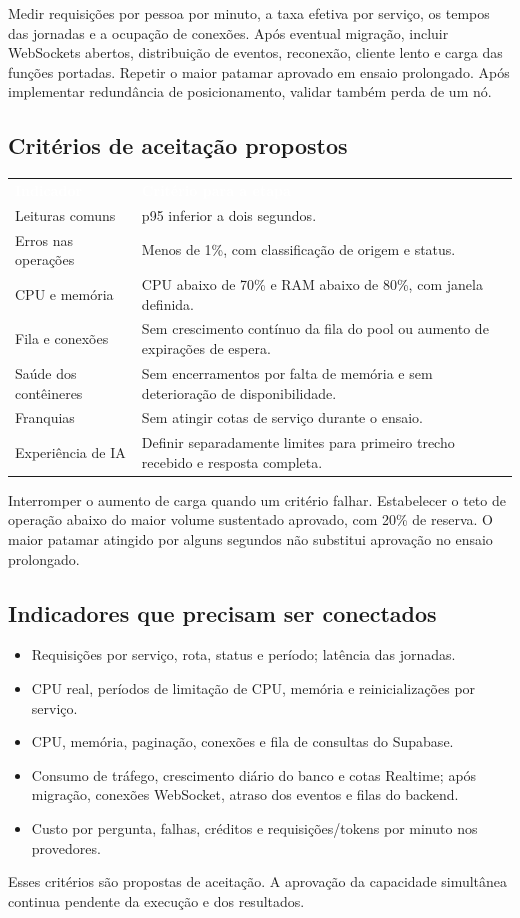 \documentclass[10pt,a4paper]{article}
\newcommand{\smallnote}[1]{\par{\footnotesize\color{NFMuted}#1\par}}
\newcommand{\headcell}[1]{\textcolor{white}{\bfseries #1}}
\begin{document}
Medir requisições por pessoa por minuto, a taxa efetiva por serviço, os tempos das jornadas e a ocupação de conexões. Após eventual migração, incluir WebSockets abertos, distribuição de eventos, reconexão, cliente lento e carga das funções portadas. Repetir o maior patamar aprovado em ensaio prolongado. Após implementar redundância de posicionamento, validar também perda de um nó.

\subsection{Critérios de aceitação propostos}
\begingroup\small\renewcommand{\arraystretch}{1.3}
\par\noindent\begin{tabularx}{\linewidth}{@{}L{42mm}Y@{}}
\headcell{Indicador}&\headcell{Critério para a etapa}\\
Leituras comuns&p95 inferior a dois segundos.\\
Erros nas operações&Menos de 1\%, com classificação de origem e status.\\
CPU e memória&CPU abaixo de 70\% e RAM abaixo de 80\%, com janela definida.\\
Fila e conexões&Sem crescimento contínuo da fila do pool ou aumento de expirações de espera.\\
Saúde dos contêineres&Sem encerramentos por falta de memória e sem deterioração de disponibilidade.\\
Franquias&Sem atingir cotas de serviço durante o ensaio.\\
Experiência de IA&Definir separadamente limites para primeiro trecho recebido e resposta completa.\\
\end{tabularx}\endgroup

Interromper o aumento de carga quando um critério falhar. Estabelecer o teto de operação abaixo do maior volume sustentado aprovado, com 20\% de reserva. O maior patamar atingido por alguns segundos não substitui aprovação no ensaio prolongado.

\subsection{Indicadores que precisam ser conectados}
\begin{itemize}
\item Requisições por serviço, rota, status e período; latência das jornadas.
\item CPU real, períodos de limitação de CPU, memória e reinicializações por serviço.
\item CPU, memória, paginação, conexões e fila de consultas do Supabase.
\item Consumo de tráfego, crescimento diário do banco e cotas Realtime; após migração, conexões WebSocket, atraso dos eventos e filas do backend.
\item Custo por pergunta, falhas, créditos e requisições/tokens por minuto nos provedores.
\end{itemize}
\smallnote{Esses critérios são propostas de aceitação. A aprovação da capacidade simultânea continua pendente da execução e dos resultados.}
\end{document}
